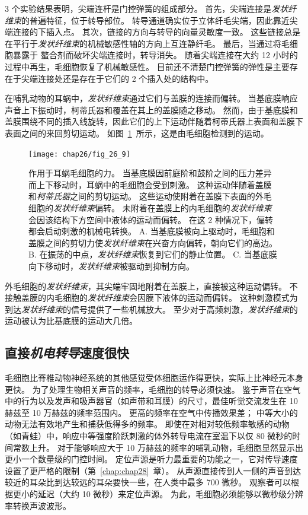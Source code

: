 3 个实验结果表明，尖端连杆是门控弹簧的组成部分。
首先，尖端连接是\textit{发状纤维束}的普遍特征，位于转导部位。
转导通道确实位于立体纤毛尖端，因此靠近尖端连接的下插入点。
其次，链接的方向与转导的向量灵敏度一致。
这些链接总是在平行于\textit{发状纤维束}的机械敏感性轴的方向上互连静纤毛。
最后，当通过将毛细胞暴露于  螯合剂而破坏尖端连接时，转导消失。
随着尖端连接在大约 12 小时的过程中再生，毛细胞恢复了机械敏感性。
目前还不清楚门控弹簧的弹性是主要存在于尖端连接处还是存在于它们的 2 个插入处的结构中。


在哺乳动物的耳蜗中，\textit{发状纤维束}通过它们与盖膜的连接而偏转。
当基底膜响应声音上下振动时，柯蒂氏器和覆盖在其上的盖膜随之移动。
然而，由于基底膜和盖膜围绕不同的插入线旋转，因此它们的上下运动伴随着柯蒂氏器上表面和盖膜下表面之间的来回剪切运动。
如图~\ref{fig:26_9}~所示，这是由毛细胞检测到的运动。


\begin{figure}[htbp]
	\centering
	\texttt{[image: chap26/fig\_26\_9]}
	\caption{作用于耳蜗毛细胞的力。
		当基底膜因前庭阶和鼓阶之间的压力差异而上下移动时，耳蜗中的毛细胞会受到刺激。
		这种运动伴随着盖膜和\textit{柯蒂氏器}之间的剪切运动。 
		这些运动使附着在盖膜下表面的外毛细胞的\textit{发状纤维束}偏转。
		未附着在盖膜上的内毛细胞的\textit{发状纤维束}会因该结构下方空间中液体的运动而偏转。
		在这 2 种情况下，偏转都会启动刺激的机械电转换。
		A. 当基底膜被向上驱动时，毛细胞和盖膜之间的剪切力使\textit{发状纤维束}在兴奋方向偏转，朝向它们的高边。
		B. 在振荡的中点，\textit{发状纤维束}恢复到它们的静止位置。
		C. 当基底膜向下移动时，\textit{发状纤维束}被驱动到抑制方向。}
	\label{fig:26_9}
\end{figure}


外毛细胞的\textit{发状纤维束}，其尖端牢固地附着在盖膜上，直接被这种运动偏转。
不接触盖膜的内毛细胞的\textit{发状纤维束}会因膜下液体的运动而偏转。
这种刺激模式为到达\textit{发状纤维束}的信号提供了一些机械放大。
至少对于高频刺激，\textit{发状纤维束}的运动被认为比基底膜的运动大几倍。



\subsection{直接\textit{机电转导}速度很快}

毛细胞比脊椎动物神经系统的其他感觉受体细胞运作得更快，实际上比神经元本身更快。
为了处理生物相关声音的频率，毛细胞的转导必须快速。 
鉴于声音在空气中的行为以及发声和吸声器官（如声带和耳膜）的尺寸，最佳听觉交流发生在 10 赫兹至 10 万赫兹的频率范围内。
更高的频率在空气中传播效果差；
中等大小的动物无法有效地产生和捕获低得多的频率。
即使在对相对较低频率敏感的动物（如青蛙）中，响应中等强度阶跃刺激的体外转导电流在室温下以仅 80 微秒的时间常数上升。
对于能够响应大于 10 万赫兹的频率的哺乳动物，毛细胞显然显示出更小一个数量级的门控时间。
定位声源是听力最重要的功能之一，它对传导速度设置了更严格的限制（第~\ref{chap:chap28}~章）。
从声源直接传到人一侧的声音到达较近的耳朵比到达较远的耳朵要快一些，在人类中最多 700 微秒。
观察者可以根据更小的延迟（大约 10 微秒）来定位声源。
为此，毛细胞必须能够以微秒级分辨率转换声波波形。



